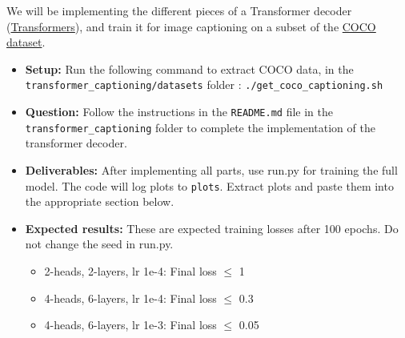 \documentclass{article}
\begin{document}
We will be implementing the different pieces of a Transformer decoder (\href{https://arxiv.org/pdf/1706.03762.pdf}{Transformers}), and train it for image captioning on a subset of the \href{https://cocodataset.org/#home}{COCO dataset}. 
\begin{itemize}
    \item \textbf{Setup:} Run the following command to extract COCO data, in the \texttt{transformer\_captioning/datasets} folder : \texttt{./get\_coco\_captioning.sh}
\item \textbf{Question:} Follow the instructions in the \texttt{README.md} file in the \texttt{transformer\_captioning} folder to complete the implementation of the transformer decoder.
\item \textbf{Deliverables:} After implementing all parts, use run.py for training the full model. The code will log plots to \texttt{plots}. Extract plots and paste them into the appropriate section below. 

\item \textbf{Expected results:}
    These are expected training losses after 100 epochs. Do not change the seed in run.py.
    \begin{itemize}
        \item 2-heads, 2-layers, lr 1e-4: Final loss $\leq$ 1 
        \item 4-heads, 6-layers, lr 1e-4: Final loss $\leq$ 0.3 
        \item 4-heads, 6-layers, lr 1e-3: Final loss $\leq$ 0.05
    \end{itemize}
\end{itemize}
\end{document}
